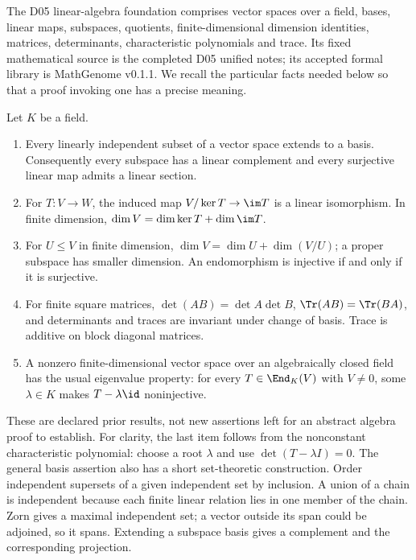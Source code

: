 The D05 linear-algebra foundation comprises vector spaces over a field,
bases, linear maps, subspaces, quotients, finite-dimensional dimension
identities, matrices, determinants, characteristic polynomials and trace.
Its fixed mathematical source is the completed D05 unified notes; its
accepted formal library is MathGenome v0.1.1. We recall the particular
facts needed below so that a proof invoking one has a precise meaning.

\begin{theorem}\label{thm:linear-foundation}
Let $K$ be a field.
\begin{enumerate}[label=(\roman*)]
\item Every linearly independent subset of a vector space extends to a
basis. Consequently every subspace has a linear complement and every
surjective linear map admits a linear section.
\item For $T:V\to W$, the induced map $V/\ker T\to\im T$ is a linear
isomorphism. In finite dimension,
$\dim V=\dim\ker T+\dim\im T$.
\item For $U\leq V$ in finite dimension,
$\dim V=\dim U+\dim(V/U)$; a proper subspace has smaller dimension.
An endomorphism is injective if and only if it is surjective.
\item For finite square matrices, $\det(AB)=\det A\det B$,
$\Tr(AB)=\Tr(BA)$, and determinants and traces are invariant under
change of basis. Trace is additive on block diagonal matrices.
\item A nonzero finite-dimensional vector space over an
algebraically closed field has the usual eigenvalue property: for every
$T\in\End_K(V)$ with $V\ne0$, some $\lambda\in K$ makes
$T-\lambda\id$ noninjective.
\end{enumerate}
\end{theorem}
These are declared prior results, not new assertions left for an abstract
algebra proof to establish. For clarity, the last item follows from the
nonconstant characteristic polynomial: choose a root $\lambda$ and use
$\det(T-\lambda I)=0$. The general basis assertion also has a short
set-theoretic construction. Order independent supersets of a given
independent set by inclusion. A union of a chain is independent because
each finite linear relation lies in one member of the chain. Zorn gives
a maximal independent set; a vector outside its span could be adjoined,
so it spans. Extending a subspace basis gives a complement and the
corresponding projection.

